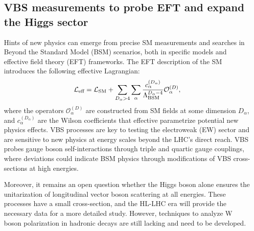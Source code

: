 {\begin{flushleft}
\section{VBS measurements to probe EFT and expand the Higgs sector}

Hints of new physics can emerge from precise SM measurements and searches in Beyond the Standard Model (BSM) scenarios, both in specific models and effective field theory (EFT) frameworks. The EFT description of the SM introduces the following effective Lagrangian:
\begin{equation}
    \mathcal{L}_{\text{eff}} = \mathcal{L}_{\text{SM}} + \sum_{D_\alpha>4}\sum_{\alpha}\dfrac{c_\alpha^{(D_\alpha)}}{\Lambda_{\text{BSM}}^{D_\alpha-4}}\mathcal{O}^{(D)}_\alpha \space,
\end{equation}
where the operators $\mathcal{O}_\alpha^{(D)}$ are constructed from SM fields at some dimension $D_\alpha$, and $c_\alpha^{(D_\alpha)}$ are the Wilson coefficients that effective parametrize potential new physics effects.
VBS processes are key to testing the electroweak (EW) sector and are sensitive to new physics at energy scales beyond the LHC’s direct reach. VBS probes gauge boson self-interactions through triple and quartic gauge couplings, where deviations could indicate BSM physics through modifications of VBS cross-sections at high energies.
 
Moreover, it remains an open question whether the Higgs boson alone ensures the unitarization of longitudinal vector boson scattering at all energies. These processes have a small cross-section, and the HL-LHC era will provide the necessary data for a more detailed study. However, techniques to analyze W boson polarization in hadronic decays are still lacking and need to be developed.


\end{flushleft}}
